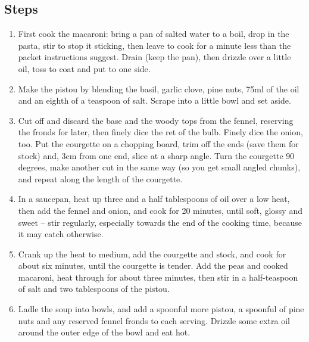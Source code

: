 \documentclass{book}
\begin{document}
\subsection*{Steps}
\begin{enumerate}
\item First cook the macaroni: bring a pan of salted water to a boil, drop in the pasta, stir to stop it sticking, then leave to cook for a minute less than the packet instructions suggest. Drain (keep the pan), then drizzle over a little oil, toss to coat and put to one side.
\item Make the pistou by blending the basil, garlic clove, pine nuts, 75ml of the oil and an eighth of a teaspoon of salt. Scrape into a little bowl and set aside.
\item Cut off and discard the base and the woody tops from the fennel, reserving the fronds for later, then finely dice the ret of the bulb. Finely dice the onion, too. Put the courgette on a chopping board, trim off the ends (save them for stock) and, 3cm from one end, slice at a sharp angle. Turn the courgette 90 degrees, make another cut in the same way (so you get small angled chunks), and repeat along the length of the courgette.
\item In a saucepan, heat up three and a half tablespoons of oil over a low heat, then add the fennel and onion, and cook for 20 minutes, until soft, glossy and sweet – stir regularly, especially towards the end of the cooking time, because it may catch otherwise.
\item Crank up the heat to medium, add the courgette and stock, and cook for about six minutes, until the courgette is tender. Add the peas and cooked macaroni, heat through for about three minutes, then stir in a half-teaspoon of salt and two tablespoons of the pistou.
\item Ladle the soup into bowls, and add a spoonful more pistou, a spoonful of pine nuts and any reserved fennel fronds to each serving. Drizzle some extra oil around the outer edge of the bowl and eat hot.
\end{enumerate}
\newpage
\end{document}
